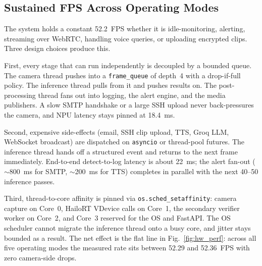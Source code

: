 \documentclass{ieeeaccess}
\begin{document}
\begin{table}[ht!]
\caption{\textbf{YOLOv8 Variant Selection (Hailo-8L Budget)}}
\label{tab:arch_select}
\setlength{\tabcolsep}{3pt}
\centering\small
{}
\end{table}

\subsection{Sustained FPS Across Operating Modes}
\label{sec:async_fps}
The system holds a constant 52.2~FPS whether it is idle-monitoring, alerting, streaming over WebRTC, handling voice queries, or uploading encrypted clips. Three design choices produce this.

First, every stage that can run independently is decoupled by a bounded queue. The camera thread pushes into a \texttt{frame\_queue} of depth~4 with a drop-if-full policy. The inference thread pulls from it and pushes results on. The post-processing thread fans out into logging, the alert engine, and the media publishers. A slow SMTP handshake or a large SSH upload never back-pressures the camera, and NPU latency stays pinned at 18.4~ms.

Second, expensive side-effects (email, SSH clip upload, TTS, Groq LLM, WebSocket broadcast) are dispatched on \texttt{asyncio} or thread-pool futures. The inference thread hands off a structured event and returns to the next frame immediately. End-to-end detect-to-log latency is about 22~ms; the alert fan-out ($\sim$800~ms for SMTP, $\sim$200~ms for TTS) completes in parallel with the next 40--50 inference passes.

Third, thread-to-core affinity is pinned via \texttt{os.sched\_setaffinity}: camera capture on Core~0, HailoRT VDevice calls on Core~1, the secondary verifier worker on Core~2, and Core~3 reserved for the OS and FastAPI. The OS scheduler cannot migrate the inference thread onto a busy core, and jitter stays bounded as a result. The net effect is the flat line in Fig.~\ref{fig:hw_perf}: across all five operating modes the measured rate sits between 52.29 and 52.36~FPS with zero camera-side drops.
\end{document}

